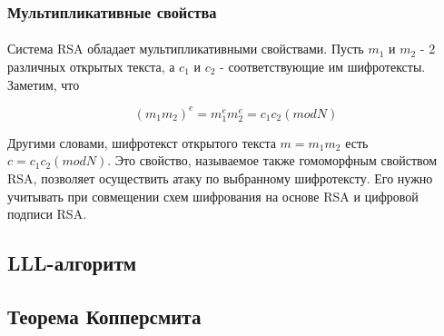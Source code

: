 \subsubsection{Мультипликативные свойства}

  \paragraph{} Система RSA обладает мультипликативными свойствами. Пусть \textit{{$m_1$}} и \textit{{$m_2$}} - 2 различных открытых текста, а \textit{{$c_1$}}
  и \textit{{$c_2$}} - соответствующие им шифротексты. Заметим, что
  
    \begin{equation}
      \textit{{$(m_1 m_2)^e = m_1^e m_2^e = c_1 c_2 (mod N)$}}
    \end{equation}

  Другими словами, шифротекст открытого текста \textit{{$m = m_1 m_2$}} есть \textit{{$c = c_1 c_2 (mod N)$}}. Это свойство, называемое также гомоморфным 
  свойством  RSA, позволяет осуществить атаку по выбранному шифротексту. Его нужно учитывать при совмещении схем шифрования на основе RSA и цифровой подписи
  RSA.

\subsection{LLL-алгоритм}

\paragraph{}

\subsection{Теорема Копперсмита}

\paragraph{}